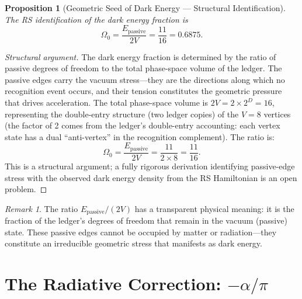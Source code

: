 \documentclass[12pt,a4paper]{article}
\newtheorem{proposition}[theorem]{Proposition}
\theoremstyle{definition}
\theoremstyle{remark}
\newtheorem{remark}[theorem]{Remark}
\begin{document}
\begin{proposition}[Geometric Seed of Dark Energy --- Structural Identification]
\label{thm:seed}
The RS identification of the dark energy fraction is
\begin{equation}
  \Omega_0 = \frac{E_{\mathrm{passive}}}{2V}
  = \frac{11}{16} = 0.6875.
\end{equation}
\end{proposition}

\begin{proof}[Structural argument]
The dark energy fraction is determined by the ratio of passive
degrees of freedom to the total phase-space volume of the
ledger.  The passive edges carry the vacuum stress---they are
the directions along which no recognition event occurs, and
their tension constitutes the geometric pressure that drives
acceleration.  The total phase-space volume is $2V = 2 \times
2^D = 16$, representing the double-entry structure (two ledger
copies) of the $V = 8$ vertices (the factor of 2 comes from
the ledger's double-entry accounting: each vertex state has a
dual ``anti-vertex'' in the recognition complement).  The ratio is:
\begin{equation}
  \Omega_0 = \frac{E_{\mathrm{passive}}}{2V}
  = \frac{11}{2 \times 8} = \frac{11}{16}.
\end{equation}
This is a structural argument; a fully rigorous derivation
identifying passive-edge stress with the observed dark energy
density from the RS Hamiltonian is an open problem.
\end{proof}

\begin{remark}
The ratio $E_{\mathrm{passive}}/(2V)$ has a transparent physical
meaning: it is the fraction of the ledger's degrees of freedom
that remain in the vacuum (passive) state.  These passive edges
cannot be occupied by matter or radiation---they constitute an
irreducible geometric stress that manifests as dark energy.
\end{remark}

\section{The Radiative Correction: $-\alpha/\pi$}
\label{sec:correction}
\end{document}
